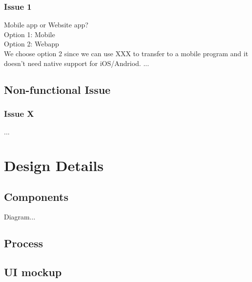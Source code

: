 \documentclass[12pt]{article}
\begin{document}
\subsubsection{Issue 1}
Mobile app or Website app? \\
Option 1: Mobile \\
Option 2: Webapp \\

We choose option 2 since we can use XXX to transfer to a mobile program and it doesn't need native support for iOS/Andriod.
...

\subsection{Non-functional Issue}
\subsubsection{Issue X}
...

\section{Design Details}

\subsection{Components}

Diagram...
\subsection{Process}

\subsection{UI mockup}
\end{document}
